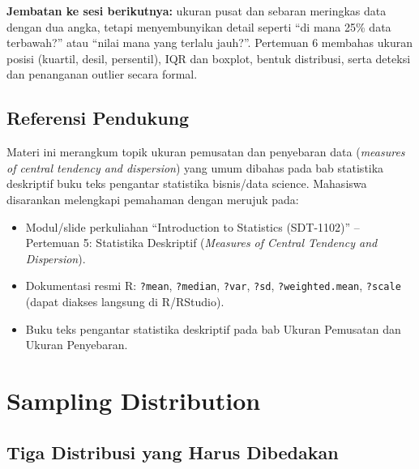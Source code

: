 \documentclass[
  indonesian,
  letterpaper,
]{book}
\providecommand{\tightlist}{%
  \setlength{\itemsep}{0pt}\setlength{\parskip}{0pt}}
\begin{document}
\textbf{Jembatan ke sesi berikutnya:} ukuran pusat dan sebaran meringkas
data dengan dua angka, tetapi menyembunyikan detail seperti ``di mana
25\% data terbawah?'' atau ``nilai mana yang terlalu jauh?''. Pertemuan
6 membahas ukuran posisi (kuartil, desil, persentil), IQR dan boxplot,
bentuk distribusi, serta deteksi dan penanganan outlier secara formal.

\section{Referensi Pendukung}\label{referensi-pendukung-4}

Materi ini merangkum topik ukuran pemusatan dan penyebaran data
(\emph{measures of central tendency and dispersion}) yang umum dibahas
pada bab statistika deskriptif buku teks pengantar statistika
bisnis/data science. Mahasiswa disarankan melengkapi pemahaman dengan
merujuk pada:

\begin{itemize}
\tightlist
\item
  Modul/slide perkuliahan ``Introduction to Statistics (SDT-1102)'' --
  Pertemuan 5: Statistika Deskriptif (\emph{Measures of Central Tendency
  and Dispersion}).
\item
  Dokumentasi resmi R: \texttt{?mean}, \texttt{?median}, \texttt{?var},
  \texttt{?sd}, \texttt{?weighted.mean}, \texttt{?scale} (dapat diakses
  langsung di R/RStudio).
\item
  Buku teks pengantar statistika deskriptif pada bab Ukuran Pemusatan
  dan Ukuran Penyebaran.
\end{itemize}


\chapter{Sampling Distribution}\label{sampling-distribution}

\section{Tiga Distribusi yang Harus
Dibedakan}\label{tiga-distribusi-yang-harus-dibedakan}
\end{document}
